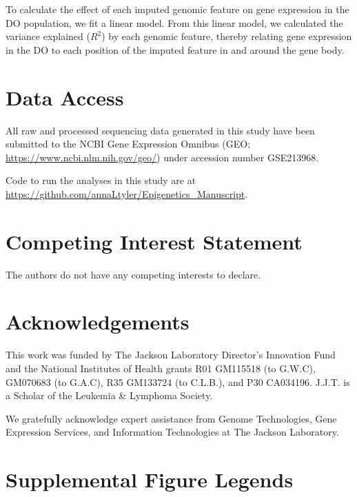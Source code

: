 \documentclass[
  11pt,
]{article}
\begin{document}
To calculate the effect of each imputed genomic feature on gene
expression in the DO population, we fit a linear model. From this linear
model, we calculated the variance explained (\(R^2\)) by each genomic
feature, thereby relating gene expression in the DO to each position of
the imputed feature in and around the gene body.

\hypertarget{data-access}{%
\section{Data Access}\label{data-access}}

All raw and processed sequencing data generated in this study have been
submitted to the NCBI Gene Expression Omnibus (GEO;
\url{https://www.ncbi.nlm.nih.gov/geo/}) under accession number
GSE213968.

Code to run the analyses in this study are at
\url{https://github.com/annaLtyler/Epigenetics_Manuscript}.

\hypertarget{competing-interest-statement}{%
\section{Competing Interest
Statement}\label{competing-interest-statement}}

The authors do not have any competing interests to declare.

\hypertarget{acknowledgements}{%
\section{Acknowledgements}\label{acknowledgements}}

This work was funded by The Jackson Laboratory Director's Innovation
Fund and the National Institutes of Health grants R01 GM115518 (to
G.W.C), GM070683 (to G.A.C), R35 GM133724 (to C.L.B.), and P30 CA034196.
J.J.T. is a Scholar of the Leukemia \& Lymphoma Society.

We gratefully acknowledge expert assistance from Genome Technologies,
Gene Expression Services, and Information Technologies at The Jackson
Laboratory.

\pagebreak

\hypertarget{supplemental-figure-legends}{%
\section{Supplemental Figure
Legends}\label{supplemental-figure-legends}}
\end{document}
